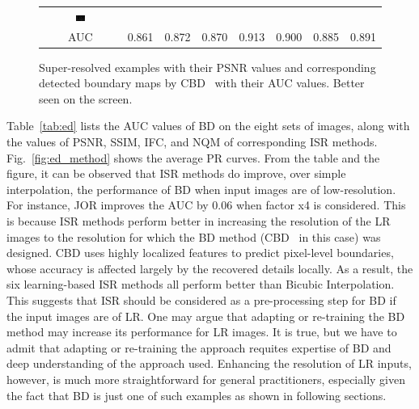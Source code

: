 \documentclass[10pt,twocolumn,letterpaper]{article}
\begin{document}
\begin{figure} [tb]
\begin{tabular*}{\textwidth}{cccccccc}
 \includegraphics[width=0.12\textwidth]{fig/ed/42049[8-SRF]_cbd.jpg} \\
    AUC & 0.861 & 0.872 & 0.870 & 0.913 & 0.900 & 0.885 & 0.891 \\
\end{tabular*}
   \caption{Super-resolved examples with their PSNR values and corresponding 
detected boundary maps by CBD~\cite{isola2014crisp} with their AUC values. 
Better seen on the screen. }
\label{fig:ed_cbd}
\end{figure}


Table~\ref{tab:ed} lists the AUC values of BD on the eight sets of
images, along with the values of PSNR, SSIM, IFC, and NQM of
corresponding ISR methods. Fig.~\ref{fig:ed_method} shows the average
PR curves. From the table and the figure, it can be observed that ISR
methods do improve, over simple interpolation, the performance of BD
when input images are of low-resolution. For instance, JOR improves
the AUC by 0.06 when factor x4 is considered. This is because ISR
methods perform better in increasing the resolution of the LR images
to the resolution for which the BD method (CBD~\cite{isola2014crisp}
in this case) was designed. CBD uses highly localized features to
predict pixel-level boundaries, whose accuracy is affected largely by
the recovered details locally. As a result, the six learning-based
ISR methods all perform better than Bicubic Interpolation.  This
suggests that ISR should be considered as a pre-processing step for 
BD if the input images are of LR. One may argue that adapting or
re-training the BD method may increase its performance for LR images.
It is true, but we have to admit that adapting or re-training the
approach requites expertise of BD and deep understanding of the
approach used. Enhancing the resolution of LR inputs, however, is much
more straightforward for general practitioners, especially given the fact that BD is just one of
such examples as shown in following sections.
\end{document}
